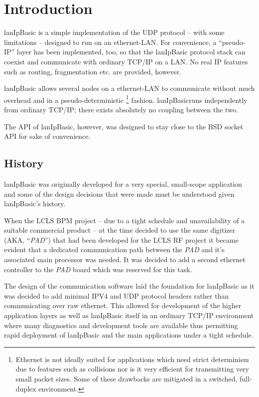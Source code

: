 \documentclass{article}
\newcommand{\lip}{lanIpBasic}
\newcommand{\ethn}{ethernet}
\newcommand{\Ethn}{Ethernet}
\newcommand{\pad}{{\em PAD}}
\begin{document}
\section{Introduction}
\lip{} is a simple implementation of the UDP protocol -- with some
limitations -- designed to run on an \ethn-LAN. For convenience,
a ``pseudo-IP'' layer has been implemented, too, so that the \lip{}
protocol stack can coexist and communicate with ordinary TCP/IP on
a LAN. No real IP features such as routing, fragmentation etc. are
provided, however.

\lip{} allows several nodes on a \ethn-LAN to communicate without much
overhead and in a pseudo-deterministic%
\footnote{
\Ethn{} is not ideally suited for applications which need strict
determinism due to features such as collisions nor is it very efficient
for transmitting very small packet sizes. Some of these drawbacks are
mitigated in a switched, full-duplex environment.
} fashion. \lip runs independently from ordinary TCP/IP; there exists
absolutely no coupling between the two.

The API of \lip, however, was designed to stay close to the BSD socket
API for sake of convenience.

  \subsection{History}
\label{sec:history}
\lip{} was originally developed for a very special, small-scope
application and some of the design decisions that were made must
be understood given \lip{}'s history.

When the LCLS BPM project -- due to a tight schedule and unavailability
of a suitable commercial product -- at the time decided to use the 
same digitizer (AKA, ``\pad'') that had been developed for the LCLS RF project
it became evident that a dedicated communication path between the \pad{}
and it's associated main processor was needed. It was decided to add
a second ethernet controller to the \pad{} board which was reserved
for this task.

The design of the communication software laid the foundation for \lip{}
as it was decided to add minimal IPV4 and UDP protocol headers rather than
communicating over raw ethernet. This allowed for development of the
higher application layers as well as \lip{} itself in an ordinary
TCP/IP environment where many diagnostics and development tools are
available thus permitting rapid deployment of \lip{} and the main
applications under a tight schedule.
\end{document}
